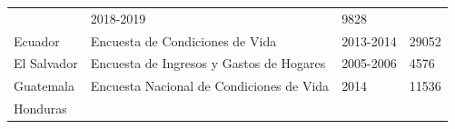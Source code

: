 \begin{longtable}[]{@{}llll@{}}
\begin{minipage}[t]{0.50\columnwidth}
\end{minipage} & \begin{minipage}[t]{0.08\columnwidth}\raggedright
2018-2019\strut
\end{minipage} & \begin{minipage}[t]{0.14\columnwidth}\raggedright
9828\strut
\end{minipage}\tabularnewline
\begin{minipage}[t]{0.17\columnwidth}\raggedright
Ecuador\strut
\end{minipage} & \begin{minipage}[t]{0.50\columnwidth}\raggedright
Encuesta de Condiciones de Vida\strut
\end{minipage} & \begin{minipage}[t]{0.08\columnwidth}\raggedright
2013-2014\strut
\end{minipage} & \begin{minipage}[t]{0.14\columnwidth}\raggedright
29052\strut
\end{minipage}\tabularnewline
\begin{minipage}[t]{0.17\columnwidth}\raggedright
El Salvador\strut
\end{minipage} & \begin{minipage}[t]{0.50\columnwidth}\raggedright
Encuesta de Ingresos y Gastos de Hogares\strut
\end{minipage} & \begin{minipage}[t]{0.08\columnwidth}\raggedright
2005-2006\strut
\end{minipage} & \begin{minipage}[t]{0.14\columnwidth}\raggedright
4576\strut
\end{minipage}\tabularnewline
\begin{minipage}[t]{0.17\columnwidth}\raggedright
Guatemala\strut
\end{minipage} & \begin{minipage}[t]{0.50\columnwidth}\raggedright
Encuesta Nacional de Condiciones de Vida\strut
\end{minipage} & \begin{minipage}[t]{0.08\columnwidth}\raggedright
2014\strut
\end{minipage} & \begin{minipage}[t]{0.14\columnwidth}\raggedright
11536\strut
\end{minipage}\tabularnewline
\begin{minipage}[t]{0.17\columnwidth}\raggedright
Honduras\strut
\end{minipage} & \begin{minipage}[t]{0.50\columnwidth}\raggedright

\end{minipage}
\end{longtable}
